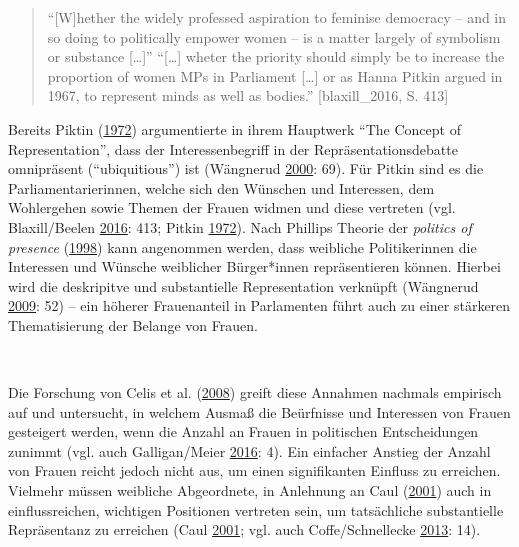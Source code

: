 \documentclass[12pt,ngerman,]{article}
\begin{document}
\begin{quote}
\enquote{{[}W{]}hether the widely professed aspiration to feminise
democracy -- and in so doing to politically empower women -- is a matter
largely of symbolism or substance {[}\ldots{}{]}}
\enquote{{[}\ldots{}{]} wheter the priority should simply be to increase
the proportion of women MPs in Parliament {[}\ldots{}{]} or as Hanna
Pitkin argued in 1967, to represent minds as well as bodies.}
{[}blaxill\_2016, S. 413{]}
\end{quote}

Bereits Piktin (\protect\hyperlink{ref-pitkin_1972}{1972}) argumentierte
in ihrem Hauptwerk \enquote{The Concept of Representation}, dass der
Interessenbegriff in der Repräsentationsdebatte omnipräsent
(\enquote{ubiquitious}) ist (Wängnerud
\protect\hyperlink{ref-wangnerud_2000}{2000}: 69). Für Pitkin sind es
die Parliamentarierinnen, welche sich den Wünschen und Interessen, dem
Wohlergehen sowie Themen der Frauen widmen und diese vertreten (vgl.
Blaxill/Beelen \protect\hyperlink{ref-blaxill_2016}{2016}: 413; Pitkin
\protect\hyperlink{ref-pitkin_1972}{1972}). Nach Phillips Theorie der
\emph{politics of presence}
(\protect\hyperlink{ref-phillips_1998}{1998}) kann angenommen werden,
dass weibliche Politikerinnen die Interessen und Wünsche weiblicher
Bürger*innen repräsentieren können. Hierbei wird die deskripitve und
substantielle Representation verknüpft (Wängnerud
\protect\hyperlink{ref-wangnerud_2009}{2009}: 52) -- ein höherer
Frauenanteil in Parlamenten führt auch zu einer stärkeren Thematisierung
der Belange von Frauen.

~

Die Forschung von Celis et al.
(\protect\hyperlink{ref-celis_2008}{2008}) greift diese Annahmen
nachmals empirisch auf und untersucht, in welchem Ausmaß die Beürfnisse
und Interessen von Frauen gesteigert werden, wenn die Anzahl an Frauen
in politischen Entscheidungen zunimmt (vgl. auch Galligan/Meier
\protect\hyperlink{ref-galligan_2016}{2016}: 4). Ein einfacher Anstieg
der Anzahl von Frauen reicht jedoch nicht aus, um einen signifikanten
Einfluss zu erreichen. Vielmehr müssen weibliche Abgeordnete, in
Anlehnung an Caul (\protect\hyperlink{ref-caul_2001}{2001}) auch in
einflussreichen, wichtigen Positionen vertreten sein, um tatsächliche
substantielle Repräsentanz zu erreichen (Caul
\protect\hyperlink{ref-caul_2001}{2001}; vgl. auch Coffe/Schnellecke
\protect\hyperlink{ref-coffe_2013}{2013}: 14).

~
\end{document}
